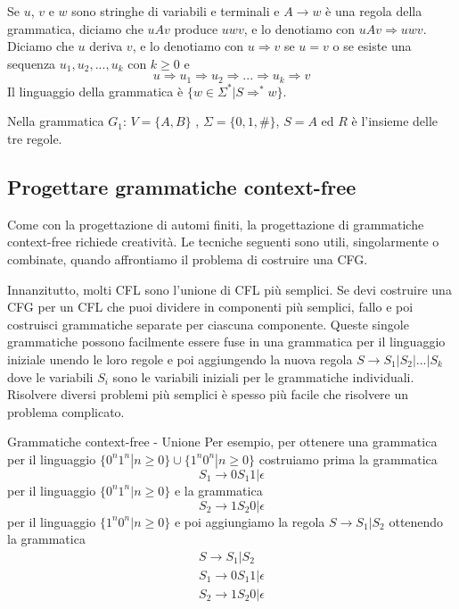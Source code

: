 Se $u$, $v$ e $w$ sono stringhe di variabili e terminali e $A\to w$ è una regola della grammatica, diciamo che $uAv$ produce $uwv$, e lo denotiamo con $uAv\Rightarrow uwv$. Diciamo che $u$ deriva $v$, e lo denotiamo con $u\Rightarrow v$ se $u = v$ o se esiste una sequenza $u_{1}, u_{2} ,...,u_k$ con $k\geq 0$ e
\begin{equation*}
u\Rightarrow u_1\Rightarrow u_2\Rightarrow...\Rightarrow u_k\Rightarrow v
\end{equation*}
Il linguaggio della grammatica è $\{ w\in\Sigma^*|S\Rightarrow^*w\}$.

Nella grammatica $G_{1}$: $V = \{A, B\}$ , $\Sigma=\{0, 1,\#\}$, $S = A$ ed $R$ è l'insieme delle tre regole.

\subsection{Progettare grammatiche context-free}
Come con la progettazione di automi finiti, la progettazione di grammatiche context-free richiede creatività. Le tecniche seguenti sono utili, singolarmente o combinate, quando affrontiamo il problema di costruire una CFG.

Innanzitutto, molti CFL sono l'unione di CFL più semplici. Se devi costruire una CFG per un CFL che puoi dividere in componenti più semplici, fallo e poi costruisci grammatiche separate per ciascuna componente. Queste singole grammatiche possono facilmente essere fuse in una grammatica per il linguaggio iniziale unendo le loro regole e poi aggiungendo la nuova regola $S\to S_{1}|S_{2}|...|S_k$ dove le variabili $S_{i}$ sono le variabili iniziali per le grammatiche individuali. Risolvere diversi problemi più semplici è spesso più facile che risolvere un problema complicato.

\begin{Example}{Grammatiche context-free - Unione}{}
Per esempio, per ottenere una grammatica per il linguaggio $\{0^n1^n|n\geq0\}\cup\{1^n0^n|n\geq0\}$ costruiamo prima la grammatica
\begin{equation*}
    S_{1}\to 0S_1 1|\epsilon    
\end{equation*}
per il linguaggio $\{0^n1^n|n\geq0\}$ e la grammatica
\begin{equation*}
    S_{2}\to 1S_2 0|\epsilon    
\end{equation*}
per il linguaggio $\{1^n0^n|n\geq0\}$ e poi aggiungiamo la regola $S\to S_1 |S_2$ ottenendo la grammatica
\begin{gather*}
    S\to S_1|S_2\\
    S_{1}\to 0S_1 1|\epsilon\\
    S_{2}\to 1S_2 0|\epsilon
\end{gather*}
\end{Example}

